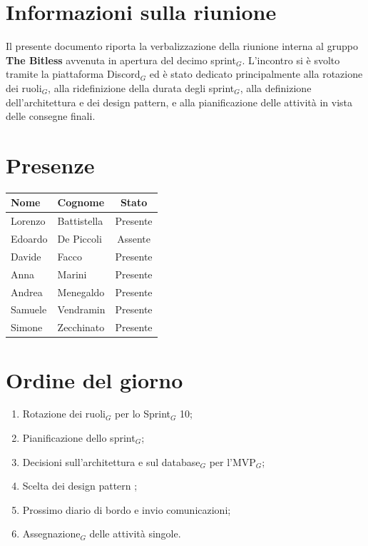 \documentclass[a4paper, 10pt, colorlinks=true, linkcolor=black, urlcolor=blue, citecolor=blue, hidelinks]{article}
\begin{document}
\newcommand{\titolo}{Verbale interno}
\newcommand{\dataverbale}{2026-08-04}
\newcommand{\dataversione}{2026-08-04}
\newcommand{\versione}{1.0.0}
\newcommand{\stato}{Approvato}
\newcommand{\destinatari}{The Bitless, prof. Tullio Vardanega, prof. Riccardo Cardin}
\def\templatedir{../../../../templates}

\begin{titlepage}

\end{titlepage}

\newpage
\tableofcontents

\newpage
{}
\section{Informazioni sulla riunione}
Il presente documento riporta la verbalizzazione della riunione interna al gruppo \textbf{The Bitless} avvenuta in apertura del decimo sprint$_G$. L'incontro si è svolto tramite la piattaforma Discord$_G$ ed è stato dedicato principalmente alla rotazione dei ruoli$_G$, alla ridefinizione della durata degli sprint$_G$, alla definizione dell'architettura e dei design pattern, e alla pianificazione delle attività in vista delle consegne finali.

\section{Presenze}
\begin{center}
\begin{tabular}{|l|l|c|}
\hline
\textbf{Nome} & \textbf{Cognome} & \textbf{Stato} \\
\hline
Lorenzo & Battistella & Presente \\
Edoardo & De Piccoli & Assente \\
Davide & Facco & Presente \\
Anna & Marini & Presente \\
Andrea & Menegaldo & Presente \\
Samuele & Vendramin & Presente \\
Simone & Zecchinato & Presente \\
\hline
\end{tabular}
\end{center}

\section{Ordine del giorno}
\begin{enumerate}
    \item Rotazione dei ruoli$_G$ per lo Sprint$_G$ 10;
    \item Pianificazione dello sprint$_G$;
    \item Decisioni sull'architettura e sul database$_G$ per l'MVP$_G$;
    \item Scelta dei design pattern ;
    \item Prossimo diario di bordo e invio comunicazioni;
    \item Assegnazione$_G$ delle attività singole.
\end{enumerate}
\end{document}
